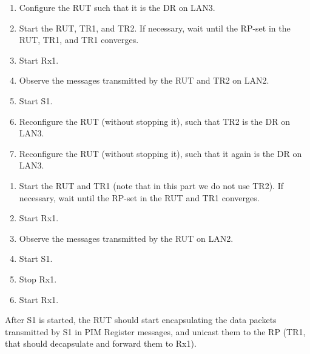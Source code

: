\documentclass[11pt]{report}
\begin{document}
\begin{enumerate}

  \item Configure the RUT such that it is the DR on LAN3.

  \item Start the RUT, TR1, and TR2. If necessary, wait until the RP-set in
        the RUT, TR1, and TR1 converges.

  \item Start Rx1.

  \item Observe the messages transmitted by the RUT and TR2 on LAN2.

  \item Start S1.

  \item Reconfigure the RUT (without stopping it), such that TR2 is the DR on
  LAN3.

  \item Reconfigure the RUT (without stopping it), such that it again is the
  DR on LAN3.

\end{enumerate}


\begin{enumerate}

  \item Start the RUT and TR1 (note that in this part we do not use TR2). If
  necessary, wait until the RP-set in the RUT and TR1 converges.

  \item Start Rx1.

  \item Observe the messages transmitted by the RUT on LAN2.

  \item Start S1.

  \item Stop Rx1.

  \item Start Rx1.

\end{enumerate}



After S1 is started, the RUT should start encapsulating
the data packets transmitted by S1 in PIM Register messages, and unicast them
to the RP (TR1, that should decapsulate and forward them to Rx1).
\end{document}
